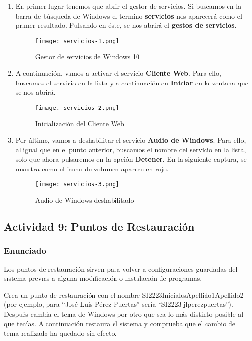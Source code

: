 \begin{enumerate}
    \item En primer lugar tenemos que abrir el gestor de servicios. Si buscamos en la barra de búsqueda de Windows el termino \textbf{servicios} nos aparecerá como el primer resultado. Pulsando en éste, se nos abrirá el \textbf{gestos de servicios}.

    \begin{figure}[H]
        \centering
        \texttt{[image: servicios-1.png]}
        \caption{Gestor de servicios de Windows 10}
    \end{figure}

    \item A continuación, vamos a activar el servicio \textbf{Cliente Web}. Para ello, buscamos el servicio en la lista y a continuación en \textbf{Iniciar} en la ventana que se nos abrirá.

    \begin{figure}[H]
        \centering
        \texttt{[image: servicios-2.png]}
        \caption{Inicialización del Cliente Web}
    \end{figure}

    \item Por último, vamos a deshabilitar el servicio \textbf{Audio de Windows}. Para ello, al igual que en el punto anterior, buscamos el nombre del servicio en la lista, solo que ahora pulsaremos en la opción \textbf{Detener}. En la siguiente captura, se muestra como el icono de volumen aparece en rojo.

    \begin{figure}[H]
        \centering
        \texttt{[image: servicios-3.png]}
        \caption{Audio de Windows deshabilitado}
    \end{figure}
\end{enumerate}

\subsection{Actividad 9: Puntos de Restauración}
\subsubsection{Enunciado}
Los puntos de restauración sirven para volver a configuraciones guardadas del sistema previas a alguna modificación o instalación de programas.

Crea un punto de restauración con el nombre SI2223InicialesApellido1Apellido2 (por ejemplo, para ``José Luis Pérez Puertas'' sería ``SI2223 jlperezpuertas''). Después cambia el tema de Windows por otro que sea lo más distinto posible al que tenías. A continuación restaura el sistema y comprueba que el cambio de tema realizado ha quedado sin efecto.

